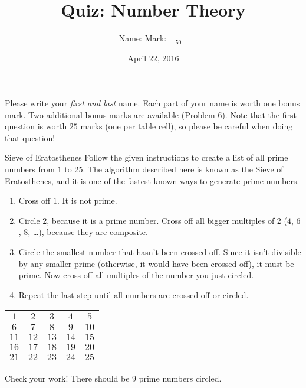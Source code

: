 \documentclass[12pt,letterpaper]{article}
\title{Quiz: Number Theory}
\author{Name: \underline{\hspace{5cm}} Mark: $\displaystyle \frac{\hspace{3em}}{50}$}
\date{April 22, 2016}
\begin{document}
\maketitle

Please write your \emph{first and last} name. Each part of your name is worth
one bonus mark. Two additional bonus marks are available (Problem 6). Note that
the first question is worth $25$ marks (one per table cell), so please be
careful when doing that question!

\thispagestyle{empty}

\begin{problem}{Sieve of Eratosthenes}
 Follow the given instructions to create a list of all prime numbers from $1$
 to $25$. The algorithm described here is known as the Sieve of Eratosthenes,
 and it is one of the fastest known ways to generate prime numbers.

 \begin{enumerate}
  \item Cross off $1$. It is not prime.
  \item Circle $2$, because it is a prime number. Cross off all bigger multiples
  of $2$ ($4$, $6$, $8$, \dots), because they are composite.
  \item Circle the smallest number that hasn't been crossed off. Since it isn't
  divisible by any smaller prime (otherwise, it would have been crossed off),
  it must be prime. Now cross off all multiples of the number you just circled.
  \item Repeat the last step until all numbers are crossed off or circled.
 \end{enumerate}

 \begin{center}
  \def\arraystretch{1.7}
  \begin{tabular}{|c|c|c|c|c|}
   \hline
   $1$ & $2$ & $3$ & $4$ & $5$ \\
   \hline
   $6$ & $7$ & $8$ & $9$ & $10$ \\
   \hline
   $11$ & $12$ & $13$ & $14$ & $15$ \\
   \hline
   $16$ & $17$ & $18$ & $19$ & $20$ \\
   \hline
   $21$ & $22$ & $23$ & $24$ & $25$ \\
   \hline
  \end{tabular}
 \end{center}

 Check your work! There should be $9$ prime numbers circled.
\end{problem}
\end{document}
